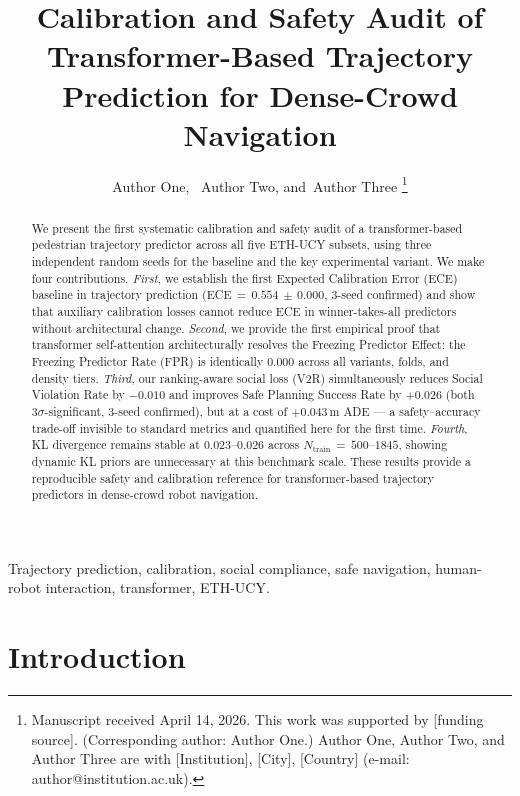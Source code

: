 \documentclass[journal,letterpaper]{IEEEtran}
\title{Calibration and Safety Audit of Transformer-Based
       Trajectory Prediction for Dense-Crowd Navigation}
\author{Author One,~\IEEEmembership{Member,~IEEE,}
        Author Two,
        and~Author Three
\thanks{Manuscript received April 14, 2026.
This work was supported by [funding source].
(Corresponding author: Author One.)
Author One, Author Two, and Author Three are with
[Institution], [City], [Country]
(e-mail: author@institution.ac.uk).}}
\begin{document}
\maketitle

\begin{abstract}
We present the first systematic calibration and safety audit of a
transformer-based pedestrian trajectory predictor across all five
ETH-UCY subsets, using three independent random seeds for the
baseline and the key experimental variant.
We make four contributions.
\emph{First}, we establish the first Expected Calibration Error (ECE)
baseline in trajectory prediction (ECE\,\(=\,0.554\,\pm\,0.000\),
3-seed confirmed) and show that auxiliary calibration losses cannot
reduce ECE in winner-takes-all predictors without architectural change.
\emph{Second}, we provide the first empirical proof that transformer
self-attention architecturally resolves the Freezing Predictor Effect:
the Freezing Predictor Rate (FPR) is identically 0.000 across all
variants, folds, and density tiers.
\emph{Third}, our ranking-aware social loss (V2R) simultaneously
reduces Social Violation Rate by \(-0.010\) and improves Safe Planning
Success Rate by \(+0.026\) (both \(3\sigma\)-significant, 3-seed
confirmed), but at a cost of \(+0.043\)\,m ADE --- a safety--accuracy
trade-off invisible to standard metrics and quantified here for the
first time.
\emph{Fourth}, KL divergence remains stable at \(0.023\)--\(0.026\)
across \(N_{\text{train}}\,{=}\,500\)--\(1845\), showing dynamic KL
priors are unnecessary at this benchmark scale.
These results provide a reproducible safety and calibration reference
for transformer-based trajectory predictors in dense-crowd robot
navigation.
\end{abstract}

\begin{IEEEkeywords}
Trajectory prediction, calibration, social compliance, safe navigation,
human-robot interaction, transformer, ETH-UCY.
\end{IEEEkeywords}

\section{Introduction}
\label{sec:intro}
\end{document}
